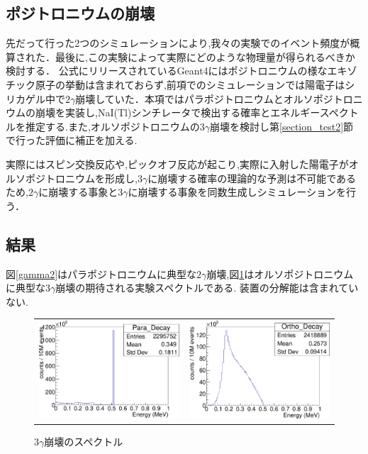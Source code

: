 \subsection{ポジトロニウムの崩壊}

先だって行った2つのシミュレーションにより,我々の実験でのイベント頻度が概算された．最後に,この実験によって実際にどのような物理量が得られるべきか検討する．
公式にリリースされているGeant4にはポジトロニウムの様なエキゾチック原子の挙動は含まれておらず,前項でのシミュレーションでは陽電子はシリカゲル中で$2\gamma$崩壊していた．本項ではパラポジトロニウムとオルソポジトロニウムの崩壊を実装し,NaI(Tl)シンチレータで検出する確率とエネルギースペクトルを推定する.また,オルソポジトロニウムの$3\gamma$崩壊を検討し第\ref{section_test2}節で行った評価に補正を加える.

実際にはスピン交換反応や,ピックオフ反応が起こり,実際に入射した陽電子がオルソポジトロニウムを形成し,$3\gamma$に崩壊する確率の理論的な予測は不可能であるため,$2\gamma$に崩壊する事象と$3\gamma$に崩壊する事象を同数生成しシミュレーションを行う．

\subsection{結果}

図\ref{gamma2}はパラポジトロニウムに典型な$2\gamma$崩壊,図\ref{gamma3}はオルソポジトロニウムに典型な$3\gamma$崩壊の期待される実験スペクトルである.
装置の分解能は含まれていない.

\begin{figure}[htbp]
	\begin{tabular}{cc}

	\centering
		\begin{minipage}{0.5\hsize}
		\includegraphics[width=7cm]{fig/gamma2.pdf}
	\caption{$2\gamma$崩壊のスペクトル}
	\label{gamma2}
		\end{minipage}&

		\begin{minipage}{0.5\hsize}
	\centering
		\includegraphics[width=7cm]{fig/gamma3.pdf}
	\caption{$3\gamma$崩壊のスペクトル}
	\label{gamma3}
		\end{minipage}

		\end{tabular}
\end{figure}

